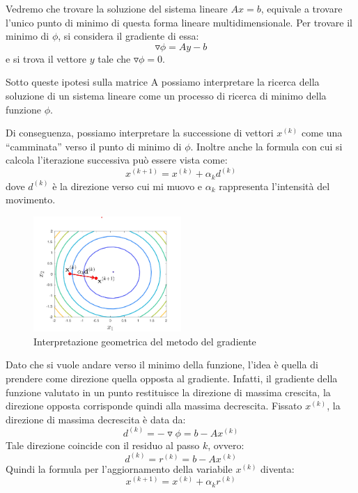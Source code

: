Vedremo che trovare la soluzione del sistema lineare $Ax = b$, equivale a trovare
l'unico punto di minimo di questa forma lineare multidimensionale. Per trovare
il minimo di $\phi$, si considera il gradiente di essa:
\begin{equation*}
    \triangledown \phi = Ay - b
\end{equation*}
e si trova il vettore $y$ tale che $\triangledown \phi = 0$.

Sotto queste ipotesi sulla matrice A possiamo interpretare la ricerca della 
soluzione di un sistema lineare come un processo di ricerca di minimo della 
funzione $\phi$.

Di conseguenza, possiamo interpretare la successione di vettori $x^{(k)}$
come una “camminata” verso il punto di minimo di $\phi$. Inoltre anche la formula 
con cui si calcola l'iterazione successiva può essere vista come:
\begin{equation}
    x^{(k + 1)} = x^{(k)} + \alpha_{k}d^{(k)}
\end{equation}
dove $d^{(k)}$ è la direzione verso cui mi muovo e $\alpha_k$ rappresenta l'intensità 
del movimento.
\begin{figure}
    \centering
    \includegraphics[width=0.5\textwidth]{./img/AnalisiNumerica/gradiente.png}
    \caption{Interpretazione geometrica del metodo del gradiente}
    \label{fig:gradiente}
\end{figure}
Dato che si vuole andare verso il minimo della funzione, l'idea è quella di 
prendere come direzione quella opposta al gradiente. Infatti, il gradiente della 
funzione valutato in un punto restituisce la direzione di massima crescita, la 
direzione opposta corrisponde quindi alla massima decrescita. Fissato $x^{(k)}$,
la direzione di massima decrescita è data da:
\begin{equation}
    d^{(k)} = -\triangledown \phi = b - Ax^{(k)}
\end{equation}
Tale direzione coincide con il residuo al passo $k$, ovvero:
\begin{equation}
    d^{(k)} = r^{(k)} = b - Ax^{(k)}
\end{equation}
Quindi la formula per l'aggiornamento della variabile $x^{(k)}$ diventa:
\begin{equation}
    x^{(k + 1)} = x^{(k)} + \alpha_{k}r^{(k)}
\end{equation}
